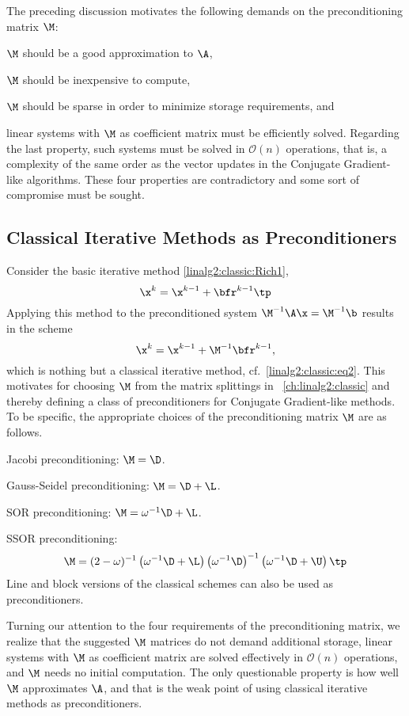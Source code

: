 The preceding discussion motivates the following
demands on the preconditioning matrix $\M$:
\ben
\item $\M$ should be a good approximation to $\A$,
\item $\M$ should be
inexpensive to compute,
\item $\M$ should be sparse in order to minimize
storage requirements, and
\item linear systems with $\M$ as coefficient
matrix must be efficiently solved.
\een
Regarding the last property, such systems
must be solved in $\mathcal{O}(n)$ operations, that is, a complexity
of the same order as the vector updates in the Conjugate Gradient-like
algorithms.
These four properties are contradictory and some sort of compromise must
be sought.

\subsection{Classical Iterative Methods as Preconditioners}
\label{ch:linalg:SORprecond}

Consider the basic iterative method \eqref{linalg2:classic:Rich1},
\[ \x^k = \x^{k-1} + \bfr^{k-1} \tp \]
Applying this method to the preconditioned system
$\M^{-1}\A\x =\M^{-1}\b$ results in the scheme
\[ \x^{k} = \x^{k-1} + \M^{-1}\bfr^{k-1} , \]
which is nothing but a classical iterative method,
cf.~\eqref{linalg2:classic:eq2}. This motivates for choosing $\M$ from
the matrix splittings in
{\LaChap}~\ref{ch:linalg2:classic} and thereby defining a class of
preconditioners for Conjugate Gradient-like methods.
To be specific, the appropriate choices of the preconditioning matrix $\M$
are as follows.
\bit
\item Jacobi preconditioning: $\M =\D$.
\item Gauss-Seidel preconditioning: $\M = \D + \L$.
\item SOR preconditioning: $\M = \omega^{-1}\D +\L$.
\item SSOR preconditioning: \[ \M = (2-\omega )^{-1}
\left( \omega^{-1}\D + \L\right)
\left( \omega^{-1}\D\right)^{-1}
\left( \omega^{-1}\D + \U\right)\tp \]
\eit
Line and block versions of the classical
schemes can also be used as preconditioners.

Turning our attention to the four requirements of the
preconditioning matrix, we
realize that the suggested $\M$ matrices do not demand additional storage,
linear systems with $\M$ as coefficient matrix are solved effectively in
$\mathcal{O}(n)$ operations, and $\M$ needs no initial computation.
The only questionable property is how well $\M$ approximates $\A$, and
that is the weak point of using classical iterative methods as
preconditioners.

